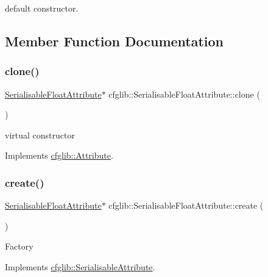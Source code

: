 default constructor. 

\subsection{Member Function Documentation}
\mbox{\label{classcfglib_1_1SerialisableFloatAttribute_a2addfc6e4ad308e1e84c2b4cdac7636b}} 
\subsubsection{\texorpdfstring{clone()}{clone()}}
{\footnotesize\ttfamily \hyperlink{classcfglib_1_1SerialisableFloatAttribute}{Serialisable\+Float\+Attribute}$\ast$ cfglib\+::\+Serialisable\+Float\+Attribute\+::clone (\begin{DoxyParamCaption}{ }\end{DoxyParamCaption})\hspace{0.3cm}{\ttfamily [virtual]}}

virtual constructor 

Implements \hyperlink{classcfglib_1_1Attribute_a107366042fdafe881215426059fec3f8}{cfglib\+::\+Attribute}.

\mbox{\label{classcfglib_1_1SerialisableFloatAttribute_a47205df866697eb0af48be24f1a0fe5b}} 
\subsubsection{\texorpdfstring{create()}{create()}}
{\footnotesize\ttfamily \hyperlink{classcfglib_1_1SerialisableFloatAttribute}{Serialisable\+Float\+Attribute}$\ast$ cfglib\+::\+Serialisable\+Float\+Attribute\+::create (\begin{DoxyParamCaption}{ }\end{DoxyParamCaption})\hspace{0.3cm}{\ttfamily [virtual]}}

Factory 

Implements \hyperlink{classcfglib_1_1SerialisableAttribute_a43e0793a2302b933997b9b3f5156ffff}{cfglib\+::\+Serialisable\+Attribute}.

